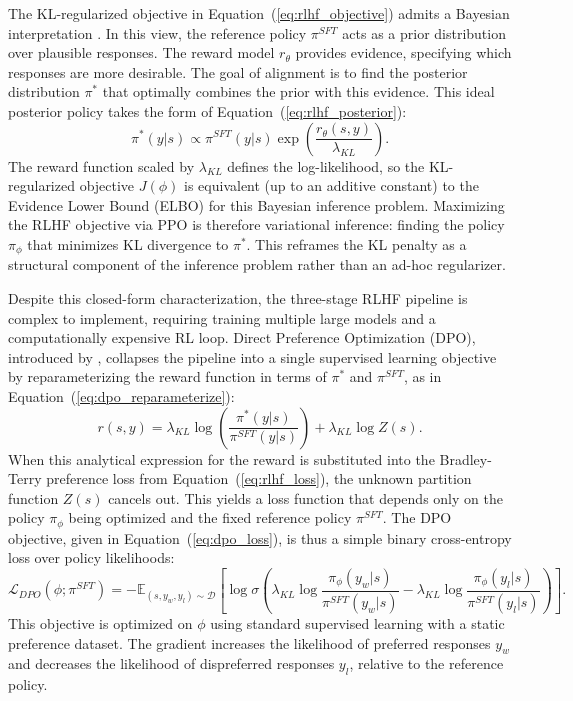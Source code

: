 The KL-regularized objective in Equation~(\ref{eq:rlhf_objective}) admits a Bayesian interpretation \citep{korbak2022rl}. In this view, the reference policy $\pi^{SFT}$ acts as a prior distribution over plausible responses. The reward model $r_\theta$ provides evidence, specifying which responses are more desirable. The goal of alignment is to find the posterior distribution $\pi^*$ that optimally combines the prior with this evidence. This ideal posterior policy takes the form of Equation~(\ref{eq:rlhf_posterior}):
\begin{equation}
    \pi^*(y|s) \propto \pi^{SFT}(y|s) \exp\left(\frac{r_\theta(s, y)}{\lambda_{KL}}\right).
\label{eq:rlhf_posterior}
\end{equation}
The reward function scaled by $\lambda_{KL}$ defines the log-likelihood, so the KL-regularized objective $J(\phi)$ is equivalent (up to an additive constant) to the Evidence Lower Bound (ELBO) for this Bayesian inference problem. Maximizing the RLHF objective via PPO is therefore variational inference: finding the policy $\pi_\phi$ that minimizes KL divergence to $\pi^*$. This reframes the KL penalty as a structural component of the inference problem rather than an ad-hoc regularizer.

Despite this closed-form characterization, the three-stage RLHF pipeline is complex to implement, requiring training multiple large models and a computationally expensive RL loop. Direct Preference Optimization (DPO), introduced by \citet{rafailov2023direct}, collapses the pipeline into a single supervised learning objective by reparameterizing the reward function in terms of $\pi^*$ and $\pi^{SFT}$, as in Equation~(\ref{eq:dpo_reparameterize}):
\begin{equation}
    r(s,y) = \lambda_{KL} \log\left(\frac{\pi^*(y|s)}{\pi^{SFT}(y|s)}\right) + \lambda_{KL} \log Z(s).
\label{eq:dpo_reparameterize}
\end{equation}
When this analytical expression for the reward is substituted into the Bradley-Terry preference loss from Equation~(\ref{eq:rlhf_loss}), the unknown partition function $Z(s)$ cancels out. This yields a loss function that depends only on the policy $\pi_\phi$ being optimized and the fixed reference policy $\pi^{SFT}$. The DPO objective, given in Equation~(\ref{eq:dpo_loss}), is thus a simple binary cross-entropy loss over policy likelihoods:
\begin{equation}
    \mathcal{L}_{DPO}(\phi; \pi^{SFT}) = -\mathbb{E}_{(s, y_w, y_l) \sim \mathcal{D}} \left[ \log \sigma \left( \lambda_{KL} \log \frac{\pi_\phi(y_w|s)}{\pi^{SFT}(y_w|s)} - \lambda_{KL} \log \frac{\pi_\phi(y_l|s)}{\pi^{SFT}(y_l|s)} \right) \right].
\label{eq:dpo_loss}
\end{equation}
This objective is optimized on $\phi$ using standard supervised learning with a static preference dataset. The gradient increases the likelihood of preferred responses $y_w$ and decreases the likelihood of dispreferred responses $y_l$, relative to the reference policy.

